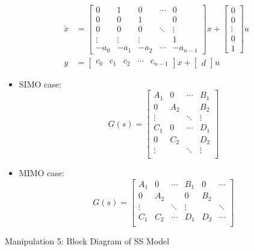\begin{equation*}
    \begin{aligned}
        \dot{x} & = \begin{bmatrix}
            0      & 1      & 0      & \cdots & 0        \\
            0      & 0      & 1      &        & 0        \\
            0      & 0      & 0      & \ddots & \vdots   \\
            \vdots & \vdots & \vdots &        & 1        \\
            -a_0   & -a_1   & -a_2   & \cdots & -a_{n-1}
        \end{bmatrix} x +
        \begin{bmatrix}
            0      \\
            0      \\
            \vdots \\
            0      \\
            1
        \end{bmatrix} u                                        \\
        y       & =\begin{bmatrix}
            c_0 & c_1 & c_2 & \cdots & c_{n-1}
        \end{bmatrix}x + \begin{bmatrix}
            d
        \end{bmatrix}u
    \end{aligned}
\end{equation*}

\begin{itemize}
    \item SIMO case:
          \[
              G(s) = \begin{bmatrix}
                  A_1    & 0   & \cdots & B_1    \\
                  0      & A_2 &        & B_2    \\
                  \vdots &     & \ddots & \vdots \\
                  C_1    & 0   & \cdots & D_1    \\
                  0      & C_2 &        & D_2    \\
                  \vdots &     & \ddots & \vdots \\
              \end{bmatrix}
          \]
    \item MIMO case:
          \[
              G(s) = \begin{bmatrix}
                  A_1    & 0   & \cdots & B_1    & 0   & \cdots \\
                  0      & A_2 &        & 0      & B_2 &        \\
                  \vdots &     & \ddots & \vdots &     & \ddots \\
                  C_1    & C_2 & \cdots & D_1    & D_2 & \cdots \\
              \end{bmatrix}
          \]
\end{itemize}
Manipulation 5: Block Diagram of SS Model

